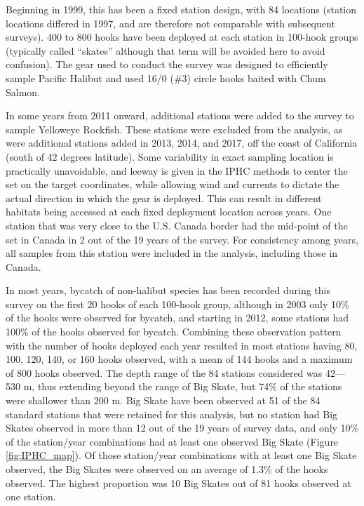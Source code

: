 \documentclass[12pt,]{article}
\begin{document}
Beginning in 1999, this has been a fixed station design, with 84
locations (station locations differed in 1997, and are therefore not
comparable with subsequent surveys). 400 to 800 hooks have been deployed
at each station in 100-hook groups (typically called ``skates'' although
that term will be avoided here to avoid confusion). The gear used to
conduct the survey was designed to efficiently sample Pacific Halibut
and used 16/0 (\#3) circle hooks baited with Chum Salmon.

In some years from 2011 onward, additional stations were added to the
survey to sample Yelloweye Rockfish. These stations were excluded from
the analysis, as were additional stations added in 2013, 2014, and 2017,
off the coast of California (south of 42 degrees latitude). Some
variability in exact sampling location is practically unavoidable, and
leeway is given in the IPHC methods to center the set on the target
coordinates, while allowing wind and currents to dictate the actual
direction in which the gear is deployed. This can result in different
habitats being accessed at each fixed deployment location across years.
One station that was very close to the U.S. Canada border had the
mid-point of the set in Canada in 2 out of the 19 years of the survey.
For consistency among years, all samples from this station were included
in the analysis, including those in Canada.

In most years, bycatch of non-halibut species has been recorded during
this survey on the first 20 hooks of each 100-hook group, although in
2003 only 10\% of the hooks were observed for bycatch, and starting in
2012, some stations had 100\% of the hooks observed for bycatch.
Combining these observation pattern with the number of hooks deployed
each year resulted in most stations having 80, 100, 120, 140, or 160
hooks observed, with a mean of 144 hooks and a maximum of 800 hooks
observed. The depth range of the 84 stations considered was 42---530 m,
thus extending beyond the range of Big Skate, but 74\% of the stations
were shallower than 200 m. Big Skate have been observed at 51 of the 84
standard stations that were retained for this analysis, but no station
had Big Skates observed in more than 12 out of the 19 years of survey
data, and only 10\% of the station/year combinations had at least one
observed Big Skate (Figure \ref{fig:IPHC_map}). Of those station/year
combinations with at least one Big Skate observed, the Big Skates were
observed on an average of 1.3\% of the hooks observed. The highest
proportion was 10 Big Skates out of 81 hooks observed at one station.
\end{document}
